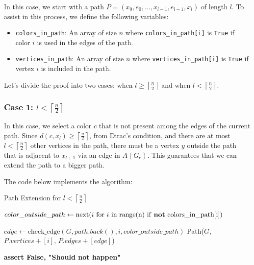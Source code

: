 In this case, we start with a path \( P = (x_0, e_0, \dots, x_{l-1}, e_{l-1}, x_{l}) \) of length \( l \). 
To assist in this process, we define the following variables:

\begin{itemize}
    \item \texttt{colors\_in\_path}: An array of size \( n \) where \texttt{colors\_in\_path[i]} is \texttt{True} if color \( i \) is used in the edges of the path.
    \item \texttt{vertices\_in\_path}: An array of size \( n \) where \texttt{vertices\_in\_path[i]} is \texttt{True} if vertex \( i \) is included in the path.
\end{itemize}

Let's divide the proof into two cases: when \( l \geq \left \lceil \frac{n}{2} \right \rceil \) and when \( l < \left \lceil \frac{n}{2} \right \rceil \).

\subsubsection{Case 1: \( l < \left \lceil \frac{n}{2} \right \rceil \)}

In this case, we select a color \( c \) that is not present among 
the edges of the current path. Since 
\( d(c, x_{l}) \geq \left \lceil \frac{n}{2} \right \rceil \), from Dirac's condition, 
and there are at most 
\( l < \left \lceil \frac{n}{2} \right \rceil \)
other vertices in the path, there must be a vertex 
\( y \) 
outside the path that is adjacent to 
\( x_{l + 1} \) via an edge in \( A(G_c) \). 
This guarantees that we can extend the path to a bigger path.

The code below implements the algorithm:

\begin{algorithm}[H]
    \caption{Path Extension for \( l < \left \lceil \frac{n}{2} \right \rceil \)}
    \begin{algorithmic}[1]
        \State $color\_outside\_path \gets \text{next}(i \text{ for } i \text{ in range(n) if \textbf{not} colors\_in\_path[i]})$

                \State $edge \gets \text{check\_edge}(G, path.back(), i, color\_outside\_path)$
                    \State \Return Path($G$, $P.vertices + [i]$, $P.edges + [edge]$)
                \EndIf
            \EndIf
        \EndFor

        \State \textbf{assert False, "Should not happen"}
    \EndFunction
    \end{algorithmic}
\end{algorithm}

